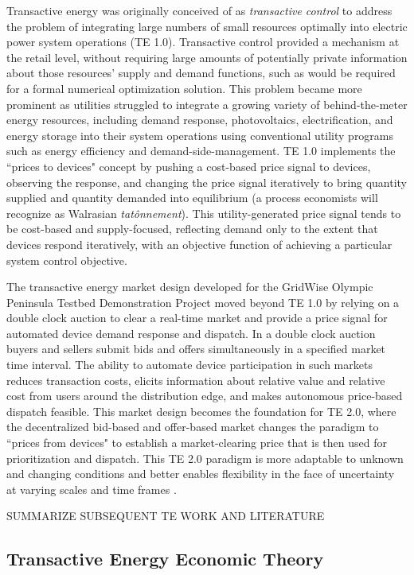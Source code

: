 Transactive energy was originally conceived of as \emph{transactive control} to address the problem of integrating large numbers of small resources optimally into electric power system operations (TE 1.0). Transactive control provided a mechanism at the retail level, without requiring large amounts of potentially private information about those resources' supply and demand functions, such as would be required for a formal numerical optimization solution.  This problem became more prominent as utilities struggled to integrate a growing variety of behind-the-meter energy resources, including demand response, photovoltaics, electrification, and energy storage into their system operations using conventional utility programs such as energy efficiency and demand-side-management. TE 1.0 implements the ``prices to devices" concept by pushing a cost-based price signal to devices, observing the response, and changing the price signal iteratively to bring quantity supplied and quantity demanded into equilibrium (a process economists will recognize as Walrasian \emph{tat\^{o}nnement}). This utility-generated price signal tends to be cost-based and supply-focused, reflecting demand only to the extent that devices respond iteratively, with an objective function of achieving a particular system control objective.

The transactive energy market design developed for the GridWise Olympic Peninsula Testbed Demonstration Project \citep{hammerstrom_2008} moved beyond TE 1.0 by relying on a double clock auction to clear a real-time market and provide a price signal for automated device demand response and dispatch. In a double clock auction buyers and sellers submit bids and offers simultaneously in a specified market time interval. The ability to automate device participation in such markets reduces transaction costs, elicits information about relative value and relative cost from users around the distribution edge, and makes autonomous price-based dispatch feasible. This market design becomes the foundation for TE 2.0, where the decentralized bid-based and offer-based market changes the paradigm to ``prices from devices" to establish a market-clearing price that is then used for prioritization and dispatch. This TE 2.0 paradigm is more adaptable to unknown and changing conditions and better enables flexibility in the face of uncertainty at varying scales and time frames \citep{chassin_kiesling_2008}.

SUMMARIZE SUBSEQUENT TE WORK AND LITERATURE

\subsection{Transactive Energy Economic Theory}


